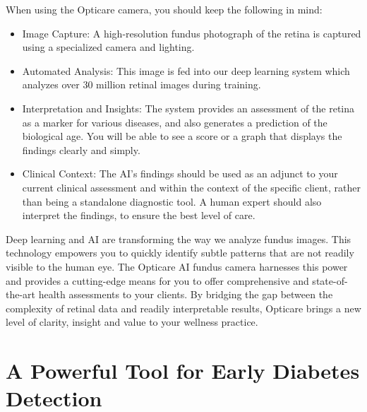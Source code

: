 \documentclass[
  Letterpaper,
]{scrbook}
\begin{document}
\begin{tcolorbox}[enhanced jigsaw, titlerule=0mm, bottomrule=.15mm, colframe=quarto-callout-note-color-frame, leftrule=.75mm, toptitle=1mm, left=2mm, breakable, title=\textcolor{quarto-callout-note-color}{\faInfo}\hspace{0.5em}{Understanding the Process}, toprule=.15mm, colback=white, coltitle=black, colbacktitle=quarto-callout-note-color!10!white, bottomtitle=1mm, arc=.35mm, opacitybacktitle=0.6, rightrule=.15mm, opacityback=0]

When using the Opticare camera, you should keep the following in mind:

\begin{itemize}
\item
  Image Capture: A high-resolution fundus photograph of the retina is
  captured using a specialized camera and lighting.
\item
  Automated Analysis: This image is fed into our deep learning system
  which analyzes over 30 million retinal images during training.
\item
  Interpretation and Insights: The system provides an assessment of the
  retina as a marker for various diseases, and also generates a
  prediction of the biological age. You will be able to see a score or a
  graph that displays the findings clearly and simply.
\item
  Clinical Context: The AI's findings should be used as an adjunct to
  your current clinical assessment and within the context of the
  specific client, rather than being a standalone diagnostic tool. A
  human expert should also interpret the findings, to ensure the best
  level of care.
\end{itemize}

\end{tcolorbox}

Deep learning and AI are transforming the way we analyze fundus images.
This technology empowers you to quickly identify subtle patterns that
are not readily visible to the human eye. The Opticare AI fundus camera
harnesses this power and provides a cutting-edge means for you to offer
comprehensive and state-of-the-art health assessments to your clients.
By bridging the gap between the complexity of retinal data and readily
interpretable results, Opticare brings a new level of clarity, insight
and value to your wellness practice.

\section{A Powerful Tool for Early Diabetes
Detection}\label{a-powerful-tool-for-early-diabetes-detection}
\end{document}
